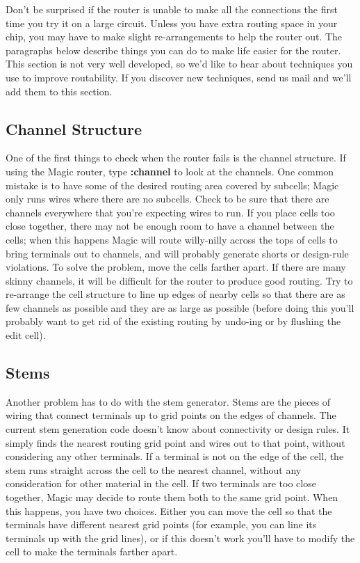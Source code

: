 \documentclass[letterpaper,twoside,12pt]{article}
\begin{document}
Don't be surprised if the router is unable to make all the connections
the first time you try it on a large circuit.  Unless you have
extra routing space in your chip, you may have to make slight
re-arrangements to help the router out.  The paragraphs below describe
things you can do to make life easier for the router.  This section
is not very well developed, so we'd like to hear about
techniques you use to improve routability.  If you discover new techniques,
send us mail and we'll add them to this section.

\subsection{Channel Structure}

One of the first things to check when the router fails is the
channel structure.  If using the Magic router, type {\bfseries :channel} to look at
the channels.
One common mistake is to have some of the desired
routing area covered by subcells;  Magic only runs wires where
there are no subcells.  Check to be sure that there are channels
everywhere that you're expecting wires to run.  If you place cells too close
together, there may not be enough room to have a channel
between the cells;  when this happens Magic will route willy-nilly
across the tops of cells to bring terminals out to channels, and will probably
generate shorts or design-rule violations.  To solve the problem,
move the cells farther apart.  If there are many skinny channels,
it will be difficult for the router to produce good routing.
Try to re-arrange the cell structure to line up edges of
nearby cells so that there are as few channels as possible
and they are as large as possible (before doing this you'll
probably want to get rid of the existing routing by undo-ing
or by flushing the edit cell).

\subsection{Stems}

Another problem has to do with the stem generator.  Stems are the
pieces of wiring that connect terminals up to grid points on the
edges of channels.  The current stem generation code doesn't know about
connectivity or design rules.
It simply finds the nearest routing grid point and wires out
to that point, without considering any other terminals.  If a
terminal is not on the edge of the cell, the stem runs straight
across the cell to the nearest channel, without any consideration
for other material in the cell.  If two
terminals are too close together, Magic may decide to route them
both to the same grid point.  When this happens, you have two
choices.  Either you can move the cell so that the terminals
have different nearest grid points (for example, you can line
its terminals up with the grid lines), or if this doesn't work
you'll have to modify the cell to make the terminals farther
apart.
\end{document}
